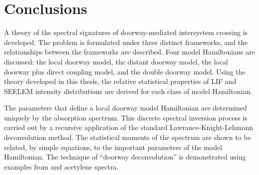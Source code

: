 \chapter{Conclusions}



A theory of the spectral signatures of doorway-mediated intersystem
crossing is developed.  The problem is formulated under three distinct
frameworks, and the relationships between the frameworks are
described.  Four model Hamiltonians are discussed: the local doorway
model, the distant doorway model, the local doorway plus direct
coupling model, and the double doorway model.  Using the theory
developed in this thesis, the relative statistical properties of LIF
and SEELEM intensity distributions are derived for each class of model
Hamiltonian.



The parameters that define a local doorway model Hamiltonian are
determined uniquely by the absorption spectrum.  This discrete
spectral inversion process is carried out by a recursive application
of the standard Lawrance-Knight-Lehmann deconvolution method.  The
statistical moments of the spectrum are shown to be related, by simple
equations, to the important parameters of the model Hamiltonian.  The
technique of ``doorway deconvolution'' is demonstrated using examples
from  and acetylene spectra.

